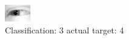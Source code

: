\begin{figure}[h!]
\begin{center}
\includegraphics[width=0.60\columnwidth]{figures/ID2485_class_3_target_4.png}
\end{center}
\caption{ Classification: 3 actual target: 4}
\label{fig:ID2485_class_3_target_4}
\end{figure}
